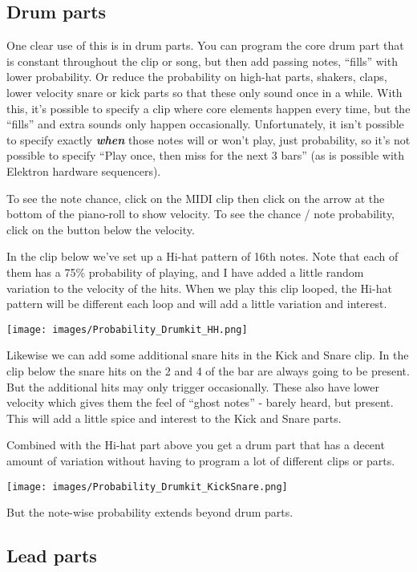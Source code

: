 \documentclass[
  12pt,
  letterpaper,
  oneside,
  open=any]{scrbook}
\begin{document}
\subsection{Drum parts}\label{drum-parts}

One clear use of this is in drum parts. You can program the core drum
part that is constant throughout the clip or song, but then add passing
notes, ``fills'' with lower probability. Or reduce the probability on
high-hat parts, shakers, claps, lower velocity snare or kick parts so
that these only sound once in a while. With this, it's possible to
specify a clip where core elements happen every time, but the ``fills''
and extra sounds only happen occasionally. Unfortunately, it isn't
possible to specify exactly \textbf{\emph{when}} those notes will or
won't play, just probability, so it's not possible to specify ``Play
once, then miss for the next 3 bars'' (as is possible with Elektron
hardware sequencers).

To see the note chance, click on the MIDI clip then click on the arrow
at the bottom of the piano-roll to show velocity. To see the chance /
note probability, click on the button below the velocity.

In the clip below we've set up a Hi-hat pattern of 16th notes. Note that
each of them has a 75\% probability of playing, and I have added a
little random variation to the velocity of the hits. When we play this
clip looped, the Hi-hat pattern will be different each loop and will add
a little variation and interest.

\texttt{[image: images/Probability\_Drumkit\_HH.png]}

Likewise we can add some additional snare hits in the Kick and Snare
clip. In the clip below the snare hits on the 2 and 4 of the bar are
always going to be present. But the additional hits may only trigger
occasionally. These also have lower velocity which gives them the feel
of ``ghost notes'' - barely heard, but present. This will add a little
spice and interest to the Kick and Snare parts.

Combined with the Hi-hat part above you get a drum part that has a
decent amount of variation without having to program a lot of different
clips or parts.

\texttt{[image: images/Probability\_Drumkit\_KickSnare.png]}

But the note-wise probability extends beyond drum parts.

\subsection{Lead parts}\label{lead-parts}
\end{document}
